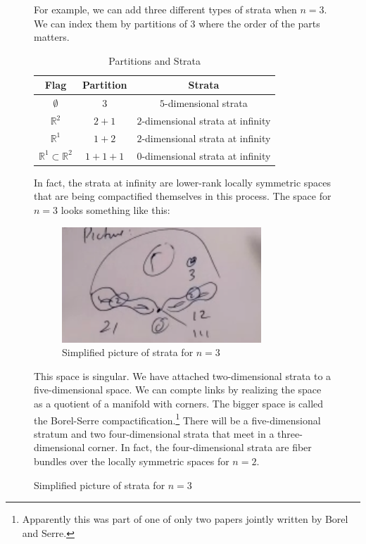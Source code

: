 \documentclass[leqno, openany]{memoir}
\theoremstyle{definition}
\theoremstyle{remark}
\theoremstyle{plain}
\theoremstyle{definition}
\theoremstyle{remark}
\newcommand{\R}{\mathbb{R}}
\begin{document}
\begin{figure}[H]
For example, we can add three different types of strata when $n=3$. We can
index them by partitions of $3$ where the order of the parts matters.
\begin{table}[H] \centering \caption{Partitions and Strata} \label{tab:label}
    \begin{tabular}{ccc} \toprule Flag & Partition & Strata \\ \midrule
        $\emptyset$ & $3$ & $5$-dimensional strata \\ $\R^2$ & $2+1$ &
        $2$-dimensional strata at infinity \\ $\R^1$ & $1+2$ & $2$-dimensional
        strata at infinity \\ $\R^1 \subset \R^2$ & $1+1+1$ & $0$-dimensional
        strata at infinity \\ \bottomrule \end{tabular} \end{table} In fact,
        the strata at infinity are lower-rank locally symmetric spaces that are
        being compactified themselves in this process. The space for $n=3$
        looks something like this: \begin{figure}[H] \centering
            \includegraphics[width=0.8\linewidth]{space.png}
            \caption{Simplified picture of strata for $n=3$}%
        \label{fig:Simplifi} \end{figure} This space is singular. We have
        attached two-dimensional strata to a five-dimensional space. We can
        compte links by realizing the space as a quotient of a manifold with
        corners. The bigger space is called the Borel-Serre
        compactification.\footnote{Apparently this was part of one of only two
        papers jointly written by Borel and Serre.} There will be a
        five-dimensional stratum and two four-dimensional strata that meet in a
        three-dimensional corner. In fact, the four-dimensional strata are
        fiber bundles over the locally symmetric spaces for $n=2$.


\end{figure}
\end{document}
